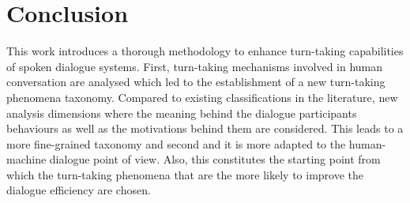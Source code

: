 \chapter*{Conclusion}

	This work introduces a thorough methodology to enhance turn-taking capabilities of spoken dialogue systems. First, turn-taking mechanisms involved in human conversation are analysed which led to the establishment of a new turn-taking phenomena taxonomy. Compared to existing classifications in the literature, new analysis dimensions where the meaning behind the dialogue participants behaviours as well as the motivations behind them are considered. This leads to a more fine-grained taxonomy and second and it is more adapted to the human-machine dialogue point of view. Also, this constitutes the starting point from which the turn-taking phenomena that are the more likely to improve the dialogue efficiency are chosen.
	
	
	
	